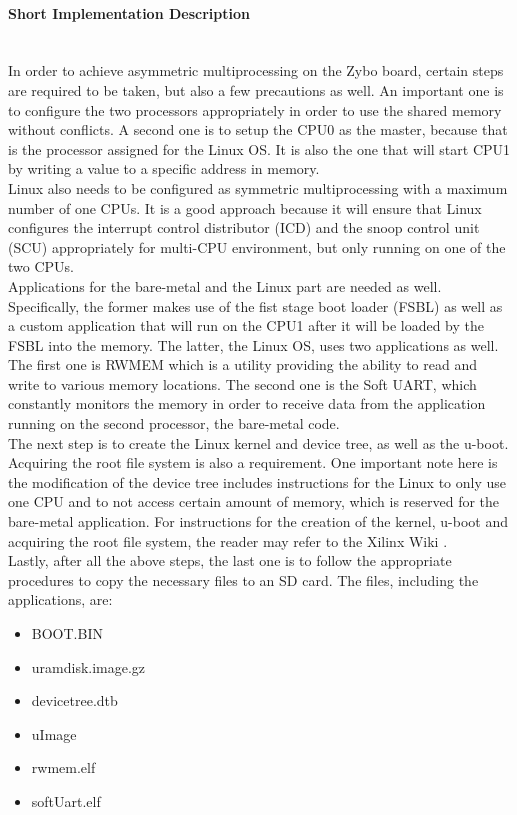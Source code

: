\paragraph{Short Implementation Description}~\\
In order to achieve asymmetric multiprocessing on the Zybo board, certain steps are required to be taken, but also a few precautions as well.
An important one is to configure the two processors appropriately in order to use the shared memory without conflicts.
A second one is to setup the CPU0 as the master, because that is the processor assigned for the Linux OS.
It is also the one that will start CPU1 by writing a value to a specific address in memory.
\\
Linux also needs to be configured as symmetric multiprocessing with a maximum number of one CPUs.
It is a good approach because it will ensure that Linux configures the interrupt control distributor (ICD) and the snoop control unit (SCU) appropriately for multi-CPU environment, but only running on one of the two CPUs.
\\
Applications for the bare-metal and the Linux part are needed as well. Specifically, the former makes use of the fist stage boot loader (FSBL) as well as a custom application that will run on the CPU1 after it will be loaded by the FSBL into the memory.
The latter, the Linux OS, uses two applications as well.
The first one is RWMEM which is a utility providing the ability to read and write to various memory locations.
The second one is the Soft UART, which constantly monitors the memory in order to receive data from the application running on the second processor, the bare-metal code.
\\
The next step is to create the Linux kernel and device tree, as well as the u-boot.
Acquiring the root file system is also a requirement.
One important note here is the modification of the device tree includes instructions for the Linux to only use one CPU and to not access certain amount of memory, which is reserved for the bare-metal application.
For instructions for the creation of the kernel, u-boot and acquiring the root file system, the reader may refer to the Xilinx Wiki \cite{Xilinx_wiki}.
\\
Lastly, after all the above steps, the last one is to follow the appropriate procedures to copy the necessary files to an SD card. The files, including the applications, are:
\begin{itemize}
\item BOOT.BIN
\item uramdisk.image.gz
\item devicetree.dtb
\item uImage
\item rwmem.elf
\item softUart.elf
\end{itemize}

